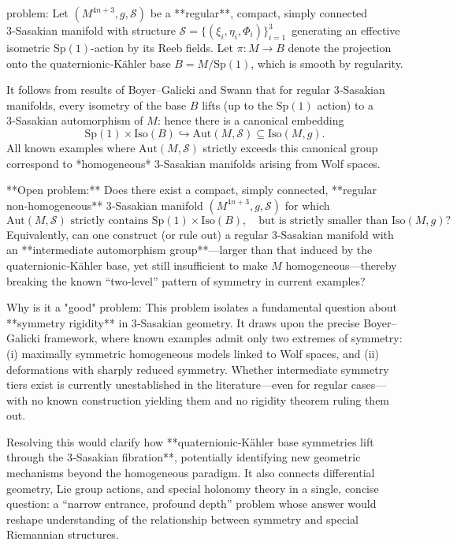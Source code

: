 problem:  
Let \( (M^{4n+3}, g, \mathcal{S}) \) be a **regular**, compact, simply connected 3‑Sasakian manifold with structure \(\mathcal{S} = \{(\xi_i, \eta_i, \Phi_i)\}_{i=1}^3\)\, generating an effective isometric \(\mathrm{Sp}(1)\)-action by its Reeb fields.  
Let \(\pi: M \to B\) denote the projection onto the quaternionic‑Kähler base \(B = M/\mathrm{Sp}(1)\), which is smooth by regularity.  

It follows from results of Boyer–Galicki and Swann that for regular 3‑Sasakian manifolds, every isometry of the base \(B\) lifts (up to the \(\mathrm{Sp}(1)\) action) to a 3‑Sasakian automorphism of \(M\): hence there is a canonical embedding  
\[
\mathrm{Sp}(1)\times\mathrm{Iso}(B) \hookrightarrow \mathrm{Aut}(M,\mathcal{S}) \subseteq \mathrm{Iso}(M,g).
\]  
All known examples where \(\mathrm{Aut}(M,\mathcal{S})\) strictly exceeds this canonical group correspond to *homogeneous* 3‑Sasakian manifolds arising from Wolf spaces.  

**Open problem:**  
Does there exist a compact, simply connected, **regular non‑homogeneous** 3‑Sasakian manifold \( (M^{4n+3}, g, \mathcal{S}) \) for which  
\[
\mathrm{Aut}(M,\mathcal{S})
\text{ strictly contains }
\mathrm{Sp}(1) \times \mathrm{Iso}(B),
\quad \text{but is strictly smaller than } \mathrm{Iso}(M,g)?
\]  
Equivalently, can one construct (or rule out) a regular 3‑Sasakian manifold with an **intermediate automorphism group**—larger than that induced by the quaternionic‑Kähler base, yet still insufficient to make \(M\) homogeneous—thereby breaking the known “two‑level” pattern of symmetry in current examples?

Why is it a "good" problem:  
This problem isolates a fundamental question about **symmetry rigidity** in 3‑Sasakian geometry. It draws upon the precise Boyer–Galicki framework, where known examples admit only two extremes of symmetry: (i) maximally symmetric homogeneous models linked to Wolf spaces, and (ii) deformations with sharply reduced symmetry. Whether intermediate symmetry tiers exist is currently unestablished in the literature—even for regular cases—with no known construction yielding them and no rigidity theorem ruling them out.  

Resolving this would clarify how **quaternionic‑Kähler base symmetries lift through the 3‑Sasakian fibration**, potentially identifying new geometric mechanisms beyond the homogeneous paradigm. It also connects differential geometry, Lie group actions, and special holonomy theory in a single, concise question: a “narrow entrance, profound depth” problem whose answer would reshape understanding of the relationship between symmetry and special Riemannian structures.